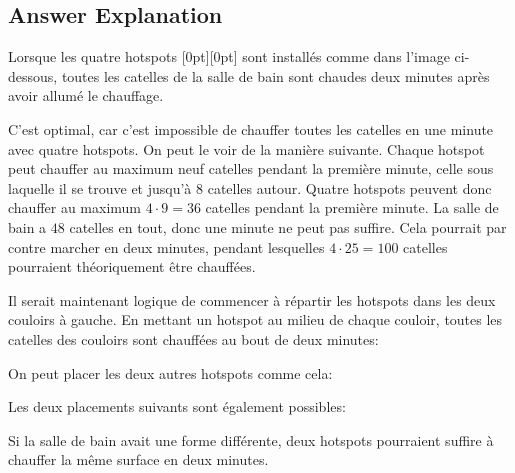 \documentclass[a4paper,11pt]{report}
\newcommand{\taskGraphicsFolder}{..}
\begin{document}
\endgroup

\subsection*{Answer Explanation}

Lorsque les quatre hotspots \raisebox{-0.5ex}[0pt][0pt]{} sont installés comme dans l’image ci-dessous, toutes les catelles de la salle de bain sont chaudes deux minutes après avoir allumé le chauffage.

C’est optimal, car c’est impossible de chauffer toutes les catelles en une minute avec quatre hotspots. On peut le voir de la manière suivante. Chaque hotspot peut chauffer au maximum neuf catelles pendant la première minute, celle sous laquelle il se trouve et jusqu’à $8$ catelles autour. Quatre hotspots peuvent donc chauffer au maximum ${4 \cdot 9 = 36}$ catelles pendant la première minute. La salle de bain a $48$ catelles en tout, donc une minute ne peut pas suffire. Cela pourrait par contre marcher en deux minutes, pendant lesquelles ${4 \cdot 25 = 100}$ catelles pourraient théoriquement être chauffées.

Il serait maintenant logique de commencer à répartir les hotspots dans les deux couloirs à gauche. En mettant un hotspot au milieu de chaque couloir, toutes les catelles des couloirs sont chauffées au bout de deux minutes:

{\centering%
\par}

On peut placer les deux autres hotspots comme cela:

{\centering%
\par}

Les deux placements suivants sont également possibles:

{\centering%
\par}

{\centering%
\par}

Si la salle de bain avait une forme différente, deux hotspots pourraient suffire à chauffer la même surface en deux minutes.
\end{document}
